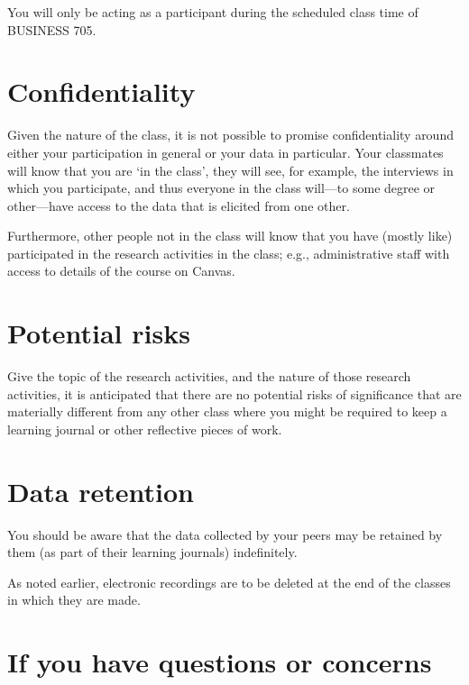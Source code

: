 \documentclass[]{book}
\theoremstyle{definition}
\theoremstyle{definition}
\theoremstyle{definition}
\theoremstyle{remark}
\begin{document}
You will only be acting as a participant during the scheduled class time
of BUSINESS 705.

\hypertarget{confidentiality}{%
\section{Confidentiality}\label{confidentiality}}

Given the nature of the class, it is not possible to promise
confidentiality around either your participation in general or your data
in particular. Your classmates will know that you are `in the class',
they will see, for example, the interviews in which you participate, and
thus everyone in the class will---to some degree or other---have access
to the data that is elicited from one other.

Furthermore, other people not in the class will know that you have
(mostly like) participated in the research activities in the class;
e.g., administrative staff with access to details of the course on
Canvas.

\hypertarget{potential-risks}{%
\section{Potential risks}\label{potential-risks}}

Give the topic of the research activities, and the nature of those
research activities, it is anticipated that there are no potential risks
of significance that are materially different from any other class where
you might be required to keep a learning journal or other reflective
pieces of work.

\hypertarget{data-retention}{%
\section{Data retention}\label{data-retention}}

You should be aware that the data collected by your peers may be
retained by them (as part of their learning journals) indefinitely.

As noted earlier, electronic recordings are to be deleted at the end of
the classes in which they are made.

\hypertarget{if-you-have-questions-or-concerns}{%
\section{If you have questions or
concerns}\label{if-you-have-questions-or-concerns}}
\end{document}
